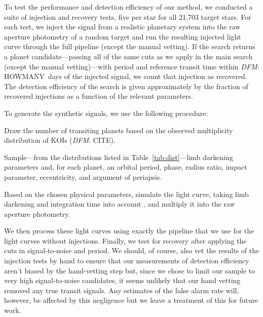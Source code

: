 \documentclass[12pt,preprint]{aastex}
\newcommand{\Tab}[1]{Table~\ref{tab:#1}}
\newcommand{\tab}[1]{\Tab{#1}}
\newcommand{\todo}[3]{{\color{#2}\emph{#1}: #3}}
\newcommand{\dfmtodo}[1]{\todo{DFM}{red}{#1}}
\begin{document}
To test the performance and detection efficiency of our method, we conducted a
suite of injection and recovery tests, five per
star for all 21,703 target stars.
For each test, we inject the signal from a realistic planetary system into the
raw aperture photometry of a random target and run the resulting injected light curve
through the full pipeline (except the manual vetting).
If the search returns a planet candidate---passing all of the same cuts as we
apply in the main search (except the manual vetting)---with period and reference transit time within
\dfmtodo{HOWMANY~days} of the injected signal, we count that injection as recovered.
The detection efficiency of the search is given approximately by the fraction
of recovered injections as a function of the relevant parameters.

To generate the synthetic signals, we use the following procedure:
\begin{enumerate}
{\item Draw the number of transiting planets based on the observed
multiplicity distribution of KOIs (\dfmtodo{CITE}).}
{\item Sample---from the distributions listed in
\tab{dist}---limb darkening parameters and, for each planet, an orbital
period, phase, radius ratio, impact parameter, eccentricity, and argument of
periapsis.}
{\item Based on the chosen physical parameters, simulate the light curve,
taking limb darkening and integration time into account \citep{ma,
kipping-int}, and multiply it into the raw aperture photometry.}
\end{enumerate}
We then process these light curves using exactly the pipeline that we use for
the light curves without injections.
Finally, we test for recovery after applying the cuts in signal-to-noise and
period.
We should, of course, also vet the results of the injection tests by hand
to ensure that our measurements of detection efficiency aren't biased by the
hand-vetting
step but, since we chose to limit our sample to very high signal-to-noise
candidates, it seems unlikely that our hand vetting removed any true transit
signals.
Any estimates of the false alarm rate will, however, be affected by this
negligence but we leave a treatment of this for future work.
\end{document}
